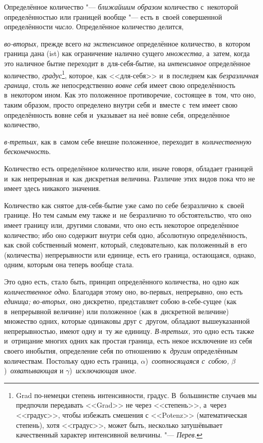 Определённое количество "--- {\em ближайшим образом} количество с~некоторой
определённостью или границей вообще "--- есть в~своей совершенной
определённости {\em число}. Определённое количество делится,

{\em во-вторых,} прежде всего {\em на экстенсивное} определённое количество,
в~котором граница дана (ist) как ограничение налично сущего {\em множества,}
а~затем, когда это наличное бытие переходит в~для-себя-бытие, на
{\em интенсивное} определённое количество, {\em градус}\footnote{Grad
по-немецки степень интенсивности, градус. В~большинстве случаев мы предпочли
передавать <<Grad>> не через <<степень>>, а~через <<градус>>, чтобы избежать
смешения с <<Potenz>> (математическая степень), хотя <<градус>>, может быть,
несколько затушёвывает качественный характер интенсивной величины. "---
{\em Перев}.}, которое, как <<для-себя>> и~в последнем как {\em безразличная
граница,} столь же непосредственно {\em вовне себя} имеет свою
определённость в~некотором ином. Как это положенное противоречие, состоящее
в~том, что оно, таким образом, просто определено внутри себя и~вместе с~тем
имеет свою определённость вовне себя и~указывает на неё вовне себя, определённое
количество,

{\em в-третьих,} как в~самом себе внешне положенное, переходит
в~{\em количественную бесконечность}.


Количество есть определённое количество или, иначе говоря, обладает границей
и~как непрерывная и~как дискретная величина. Различие этих видов пока что
не имеет здесь никакого значения.

Количество как снятое для-себя-бытие уже само по себе безразлично к~своей
границе. Но тем самым ему также и~не безразлично то обстоятельство, что оно
имеет границу или, другими словами, что оно есть некоторое определённое
количество; ибо оно содержит внутри себя одно, абсолютную определённость,
как свой собственный момент, который, следовательно, как положенный в~его
(количества) непрерывности или единице, есть его граница, остающаяся,
однако, одним, которым она теперь вообще стала.

Это одно есть, стало быть, принцип определённого количества, но одно
{\em как количественное одно}. Благодаря этому оно, во-первых, непрерывно,
оно есть {\em единица; во-вторых,} оно дискретно, представляет собою
в-себе-сущее (как в~непрерывной величине) или положенное (как в~дискретной
величине) множество одних, которые одинаковы друг с~другом, обладают
вышеуказанной непрерывностью, имеют одну и~ту же единицу. {\em В-третьих,}
это одно есть также и~отрицание многих одних как простая граница, есть некое
исключение из себя своего инобытия, определение себя по отношению
к~{\em другим} определённым количествам. Постольку одно есть граница,
$\alpha$)~{\em соотносящаяся с~собою,} $\beta$)~{\em охватывающая} и
$\gamma$)~{\em исключающая иное}.


